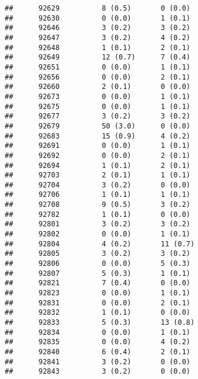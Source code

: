 \documentclass[]{article}
\begin{document}
\begin{verbatim}
##      92629          8 (0.5)       0 (0.0)                        
##      92630          0 (0.0)       1 (0.1)                        
##      92646          3 (0.2)       3 (0.2)                        
##      92647          3 (0.2)       4 (0.2)                        
##      92648          1 (0.1)       2 (0.1)                        
##      92649          12 (0.7)      7 (0.4)                        
##      92651          0 (0.0)       1 (0.1)                        
##      92656          0 (0.0)       2 (0.1)                        
##      92660          2 (0.1)       0 (0.0)                        
##      92673          0 (0.0)       1 (0.1)                        
##      92675          0 (0.0)       1 (0.1)                        
##      92677          3 (0.2)       3 (0.2)                        
##      92679          50 (3.0)      0 (0.0)                        
##      92683          15 (0.9)      4 (0.2)                        
##      92691          0 (0.0)       1 (0.1)                        
##      92692          0 (0.0)       2 (0.1)                        
##      92694          1 (0.1)       2 (0.1)                        
##      92703          2 (0.1)       1 (0.1)                        
##      92704          3 (0.2)       0 (0.0)                        
##      92706          1 (0.1)       1 (0.1)                        
##      92708          9 (0.5)       3 (0.2)                        
##      92782          1 (0.1)       0 (0.0)                        
##      92801          3 (0.2)       3 (0.2)                        
##      92802          0 (0.0)       1 (0.1)                        
##      92804          4 (0.2)       11 (0.7)                       
##      92805          3 (0.2)       3 (0.2)                        
##      92806          0 (0.0)       5 (0.3)                        
##      92807          5 (0.3)       1 (0.1)                        
##      92821          7 (0.4)       0 (0.0)                        
##      92823          0 (0.0)       1 (0.1)                        
##      92831          0 (0.0)       2 (0.1)                        
##      92832          1 (0.1)       0 (0.0)                        
##      92833          5 (0.3)       13 (0.8)                       
##      92834          0 (0.0)       1 (0.1)                        
##      92835          0 (0.0)       4 (0.2)                        
##      92840          6 (0.4)       2 (0.1)                        
##      92841          3 (0.2)       0 (0.0)                        
##      92843          3 (0.2)       0 (0.0)                        

\end{verbatim}
\end{document}
